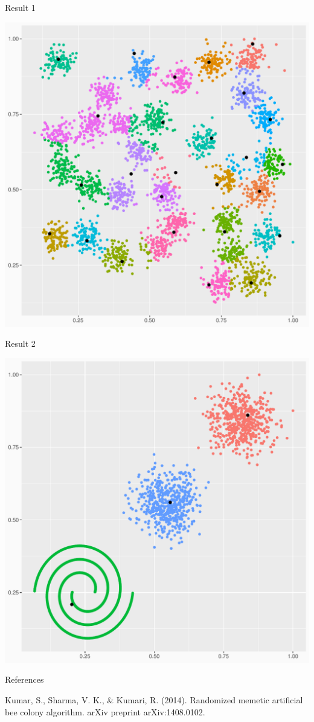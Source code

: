 \documentclass[14pt,ignorenonframetext,compress]{beamer}
\begin{document}
\begin{frame}{Result 1}
\protect\hypertarget{result-1}{}

\begin{center}\includegraphics[width=0.7\linewidth]{pre1_files/figure-beamer/unnamed-chunk-1-1} \end{center}

\end{frame}

\begin{frame}{Result 2}
\protect\hypertarget{result-2}{}

\begin{center}\includegraphics[width=0.7\linewidth]{pre1_files/figure-beamer/unnamed-chunk-2-1} \end{center}

\end{frame}

\begin{frame}[allowframebreaks]{References}
\protect\hypertarget{references}{}

Kumar, S., Sharma, V. K., \& Kumari, R. (2014). Randomized memetic
artificial bee colony algorithm. arXiv preprint arXiv:1408.0102.

\end{frame}
\end{document}
